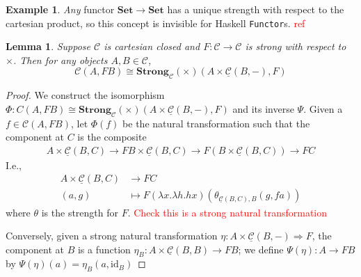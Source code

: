 \documentclass[11pt,a4paper]{article}
\theoremstyle{plain}
\newtheorem{lemma}[theorem]{Lemma}
\theoremstyle{definition}
\newtheorem{example}[theorem]{Example}
\newcommand{\C}{\mathscr{C}}
\newcommand{\homC}{\underline{\C}}
\newcommand{\Set}{\mathbf{Set}}
\newcommand{\Strong}{\mathbf{Strong}}
\newcommand{\id}{\mathrm{id}}
\newcommand{\const}{\mathrm{const}}
\newcommand{\todo}[1]{\textcolor{red}{\small #1}}
\begin{document}
\begin{example}
\emph{Any} functor $\Set \to \Set$ has a unique strength with respect to the cartesian product, so this concept is invisible for Haskell \texttt{Functor}s. \todo{ref}
\end{example}

\begin{lemma}
Suppose $\C$ is cartesian closed and $F : \C \to \C$ is strong with respect to $\times$. Then for any objects $A, B \in \C$, \[\C(A, FB) \cong \Strong_\C(\times)(A \times \homC(B, -), F)\]
\end{lemma}
\begin{proof}
We construct the isomorphism $\Phi: C(A, FB) \cong \Strong_\C(\times)(A \times \homC(B, -), F)$ and its inverse $\Psi$.
Given a $f \in \C(A, FB)$, let $\Phi(f)$ be the natural transformation such that the component at $C$ is the composite 
\begin{align*}
A \times \homC(B, C) \to FB \times \homC(B, C) \to F(B \times \homC(B, C)) \to FC
\end{align*}
I.e.,
\begin{align*}
A \times \homC(B, C) &\to FC \\
(a, g) &\mapsto F(\lambda x. \lambda h. h x)(\theta_{\homC(B, C), B}(g, f a))
\end{align*}
where $\theta$ is the strength for $F$.
\todo{Check this is a strong natural transformation}

Conversely, given a strong natural transformation $\eta : A \times \homC(B, -) \Rightarrow F$, the component at $B$ is a function $\eta_B : A \times \homC(B, B) \to FB$; we define $\Psi(\eta) : A \to FB$ by $\Psi(\eta)(a) = \eta_B(a, \id_B)$



\end{proof}
\end{document}

